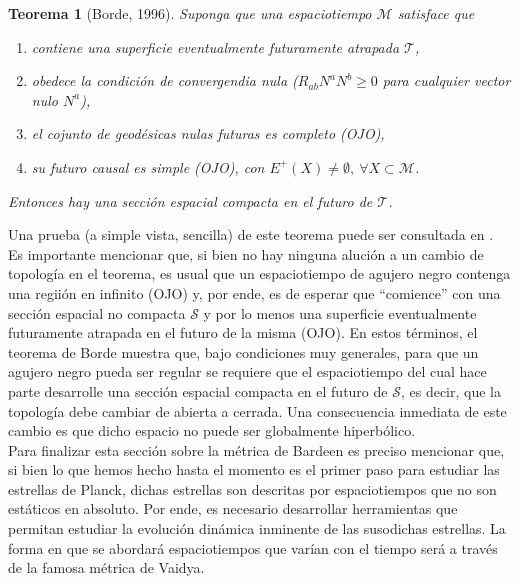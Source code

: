 \documentclass{article}
\numberwithin{equation}{section}
\newtheorem{theorem}{Teorema}[section]
\begin{document}
\begin{theorem}[Borde, 1996]
	\label{borde reg thm}
	Suponga que una espaciotiempo $\mathcal{M}$ satisface que
	
	\begin{enumerate}[i]
		\item contiene una superficie eventualmente futuramente atrapada $\mathcal{T}$,
		
		\item obedece la condición de convergendia nula ($R_{ab}N^{a}N^{b} \geq 0$ para cualquier vector nulo $N^{a}$),
		
		\item el cojunto de geodésicas nulas futuras es completo (OJO),
		
		\item su futuro causal es simple (OJO), con $E^{+}(X) \neq \emptyset,\ \forall X \subset \mathcal{M}$.
	\end{enumerate}
	
	Entonces hay una sección espacial compacta en el futuro de $\mathcal{T}$.
\end{theorem}

Una prueba (a simple vista, sencilla) de este teorema puede ser consultada en \cite{borde1996}.\\

Es importante mencionar que, si bien no hay ninguna alución a un cambio de topología en el teorema, es usual que un espaciotiempo de agujero negro contenga una regiión en infinito (OJO) y, por ende, es de esperar que ``comience'' con una sección espacial no compacta $\mathcal{S}$ y por lo menos una superficie eventualmente futuramente atrapada en el futuro de la misma (OJO). En estos términos, el teorema de Borde muestra que, bajo condiciones muy generales, para que un agujero negro pueda ser regular se requiere que el espaciotiempo del cual hace parte desarrolle una sección espacial compacta en el futuro de $\mathcal{S}$, es decir, que la topología debe cambiar de abierta a cerrada. Una consecuencia inmediata de este cambio es que dicho espacio no puede ser globalmente hiperbólico.\\

Para finalizar esta sección sobre la métrica de Bardeen es preciso mencionar que, si bien lo que hemos hecho hasta el momento es el primer paso para estudiar las estrellas de Planck, dichas estrellas son descritas por espaciotiempos que no son estáticos en absoluto. Por ende, es necesario desarrollar herramientas que permitan estudiar la evolución dinámica inminente de las susodichas estrellas. La forma en que se abordará espaciotiempos que varían con el tiempo será a través de la famosa métrica de Vaidya.
\end{document}
